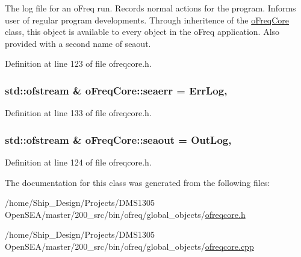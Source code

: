 The log file for an o\-Freq run. Records normal actions for the program. Informs user of regular program developments. Through inheritence of the \hyperlink{classosea_1_1ofreq_1_1o_freq_core}{o\-Freq\-Core} class, this object is available to every object in the o\-Freq application. Also provided with a second name of seaout. 



Definition at line 123 of file ofreqcore.\-h.

\hypertarget{classosea_1_1ofreq_1_1o_freq_core_aec5a7ac06574b9c5f80ac3c149c09fda}{
\subsubsection[{seaerr}]{\setlength{\rightskip}{0pt plus 5cm}std\-::ofstream \& o\-Freq\-Core\-::seaerr = {\bf Err\-Log}\hspace{0.3cm}{\ttfamily [static]}, {\ttfamily [protected]}}}\label{classosea_1_1ofreq_1_1o_freq_core_aec5a7ac06574b9c5f80ac3c149c09fda}


Definition at line 133 of file ofreqcore.\-h.

\hypertarget{classosea_1_1ofreq_1_1o_freq_core_ad1092650d598d7f30e7c0fb3dbdfd392}{
\subsubsection[{seaout}]{\setlength{\rightskip}{0pt plus 5cm}std\-::ofstream \& o\-Freq\-Core\-::seaout = {\bf Out\-Log}\hspace{0.3cm}{\ttfamily [static]}, {\ttfamily [protected]}}}\label{classosea_1_1ofreq_1_1o_freq_core_ad1092650d598d7f30e7c0fb3dbdfd392}


Definition at line 124 of file ofreqcore.\-h.



The documentation for this class was generated from the following files\-:\begin{DoxyCompactItemize}
\item 
/home/\-Ship\-\_\-\-Design/\-Projects/\-D\-M\-S1305 Open\-S\-E\-A/master/200\-\_\-src/bin/ofreq/global\-\_\-objects/\hyperlink{ofreqcore_8h}{ofreqcore.\-h}\item 
/home/\-Ship\-\_\-\-Design/\-Projects/\-D\-M\-S1305 Open\-S\-E\-A/master/200\-\_\-src/bin/ofreq/global\-\_\-objects/\hyperlink{ofreqcore_8cpp}{ofreqcore.\-cpp}\end{DoxyCompactItemize}
